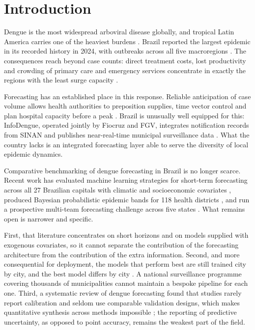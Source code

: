 \documentclass[11pt]{article}
\begin{document}
\begin{abstract}
\vspace{0.8em}
\noindent\textbf{Keywords:} dengue; forecasting; foundation model; time series;
machine learning; Brazil; epidemiological surveillance
\end{abstract}

\section{Introduction}

Dengue is the most widespread arboviral disease globally, and tropical Latin America
carries one of the heaviest burdens \citep{Leung2023}. Brazil reported the largest
epidemic in its recorded history in 2024, with outbreaks across all five macroregions
\citep{GurgelGoncalves2024}. The consequences reach beyond case counts: direct treatment
costs, lost productivity and crowding of primary care and emergency services concentrate
in exactly the regions with the least surge capacity \citep{Siqueira2022}.

Forecasting has an established place in this response. Reliable anticipation of case
volume allows health authorities to preposition supplies, time vector control and plan
hospital capacity before a peak \citep{Roster2022}. Brazil is unusually well equipped for
this: InfoDengue, operated jointly by Fiocruz and FGV, integrates notification records
from SINAN and publishes near-real-time municipal surveillance data
\citep{Codeco2018infodengue}. What the country lacks is an integrated forecasting layer
able to serve the diversity of local epidemic dynamics.

Comparative benchmarking of dengue forecasting in Brazil is no longer scarce. Recent work
has evaluated machine learning strategies for short-term forecasting across all 27
Brazilian capitals with climatic and socioeconomic covariates \citep{Silva2026capitals},
produced Bayesian probabilistic epidemic bands for 118 health districts
\citep{Freitas2025bands}, and run a prospective multi-team forecasting challenge across
five states \citep{Araujo2026sprint}. What remains open is narrower and specific.

First, that literature concentrates on short horizons and on models supplied with
exogenous covariates, so it cannot separate the contribution of the forecasting
architecture from the contribution of the extra information. Second, and more
consequential for deployment, the models that perform best are still trained city by
city, and the best model differs by city \citep{Chen2025rj,Fang2024}. A national
surveillance programme covering thousands of municipalities cannot maintain a bespoke
pipeline for each one. Third, a systematic review of dengue forecasting found that
studies rarely report calibration and seldom use comparable validation designs, which
makes quantitative synthesis across methods impossible \citep{Leung2023}; the reporting
of predictive uncertainty, as opposed to point accuracy, remains the weakest part of the
field.
\end{document}
